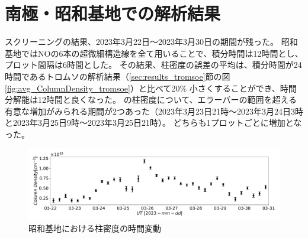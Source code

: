 \section{南極・昭和基地での解析結果}
\label{sec:results_syowa}
スクリーニングの結果、2023年3月22日〜2023年3月30日の期間が残った。
昭和基地ではNOの6本の超微細構造線を全て用いることで、積分時間は12時間とし、プロット間隔は6時間とした。
その結果、柱密度の誤差の平均は、積分時間が24時間であるトロムソの解析結果（\ref{sec:results_tromsoe}節の図\ref{fig:avg_ColumnDensity_tromsoe}）と比べて20\% 小さくすることができ、時間分解能は12時間と良くなった。
の柱密度について、エラーバーの範囲を超える有意な増加がみられる期間が2つあった（2023年3月23日21時〜2023年3月24日3時と2023年3月25日9時〜2023年3月25日21時）。
どちらも1プロットごとに増加となった。
\begin{figure}[htbp]
    \centering
    \includegraphics[width=\linewidth]{master_thesis_contents/master_thesis_fig/column_density_spectr6_syowa.pdf}
    \caption{昭和基地における柱密度の時間変動}
    \label{fig:column_density_spectr6_syowa}
\end{figure}
